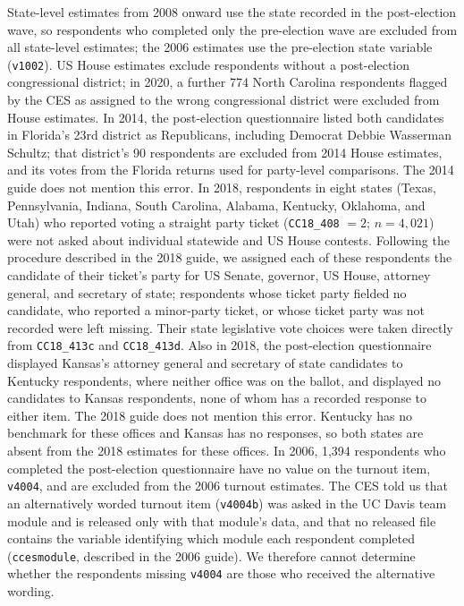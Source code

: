 \documentclass[12pt]{article}
\begin{document}
State-level estimates from 2008 onward use the state recorded in the post-election wave, so respondents who completed only the pre-election wave are excluded from all state-level estimates; the 2006 estimates use the pre-election state variable (\texttt{v1002}). US House estimates exclude respondents without a post-election congressional district; in 2020, a further 774 North Carolina respondents flagged by the CES as assigned to the wrong congressional district were excluded from House estimates. In 2014, the post-election questionnaire listed both candidates in Florida's 23rd district as Republicans, including Democrat Debbie Wasserman Schultz; that district's 90 respondents are excluded from 2014 House estimates, and its votes from the Florida returns used for party-level comparisons. The 2014 guide does not mention this error. In 2018, respondents in eight states (Texas, Pennsylvania, Indiana, South Carolina, Alabama, Kentucky, Oklahoma, and Utah) who reported voting a straight party ticket (\texttt{CC18\_408} $= 2$; $n = 4{,}021$) were not asked about individual statewide and US House contests. Following the procedure described in the 2018 guide, we assigned each of these respondents the candidate of their ticket's party for US Senate, governor, US House, attorney general, and secretary of state; respondents whose ticket party fielded no candidate, who reported a minor-party ticket, or whose ticket party was not recorded were left missing. Their state legislative vote choices were taken directly from \texttt{CC18\_413c} and \texttt{CC18\_413d}. Also in 2018, the post-election questionnaire displayed Kansas's attorney general and secretary of state candidates to Kentucky respondents, where neither office was on the ballot, and displayed no candidates to Kansas respondents, none of whom has a recorded response to either item. The 2018 guide does not mention this error. Kentucky has no benchmark for these offices and Kansas has no responses, so both states are absent from the 2018 estimates for these offices. In 2006, 1,394 respondents who completed the post-election questionnaire have no value on the turnout item, \texttt{v4004}, and are excluded from the 2006 turnout estimates. The CES told us that an alternatively worded turnout item (\texttt{v4004b}) was asked in the UC Davis team module and is released only with that module's data, and that no released file contains the variable identifying which module each respondent completed (\texttt{ccesmodule}, described in the 2006 guide). We therefore cannot determine whether the respondents missing \texttt{v4004} are those who received the alternative wording.
\end{document}
